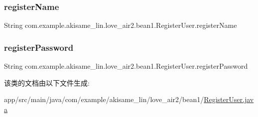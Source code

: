 \subsubsection{\texorpdfstring{registerName}{registerName}}
{\footnotesize\ttfamily String com.\+example.\+akisame\+\_\+lin.\+love\+\_\+air2.\+bean1.\+Register\+User.\+register\+Name\hspace{0.3cm}{\ttfamily [private]}}

\mbox{\label{classcom_1_1example_1_1akisame__lin_1_1love__air2_1_1bean1_1_1_register_user_a3ada3dcce6da01aa3419baf8c05f0b64}} 
\subsubsection{\texorpdfstring{registerPassword}{registerPassword}}
{\footnotesize\ttfamily String com.\+example.\+akisame\+\_\+lin.\+love\+\_\+air2.\+bean1.\+Register\+User.\+register\+Password\hspace{0.3cm}{\ttfamily [private]}}



该类的文档由以下文件生成\+:\begin{DoxyCompactItemize}
\item 
app/src/main/java/com/example/akisame\+\_\+lin/love\+\_\+air2/bean1/\mbox{\hyperlink{_register_user_8java}{Register\+User.\+java}}\end{DoxyCompactItemize}
